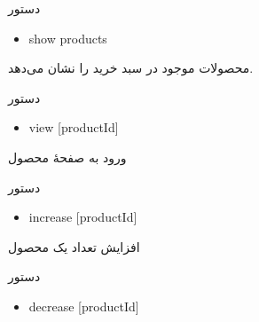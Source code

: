 \documentclass[]{article}
\begin{document}
\begin{mybox}[colback=brilliantlavender]{دستور}

\begin{latin}

\begin{itemize}[label = {$\Rightarrow$}]

\item
show products

\end{itemize}

\end{latin}

\end{mybox}

محصولات موجود در سبد خرید را نشان می‌دهد.


\begin{mybox}[colback=brilliantlavender]{دستور}

\begin{latin}

\begin{itemize}[label = {$\Rightarrow$}]

\item
view [productId]

\end{itemize}

\end{latin}

\end{mybox}

ورود به صفحهٔ محصول


\begin{mybox}[colback=brilliantlavender]{دستور}

\begin{latin}

\begin{itemize}[label = {$\Rightarrow$}]

\item
increase [productId]

\end{itemize}

\end{latin}

\end{mybox}

افزایش تعداد یک محصول



\begin{mybox}[colback=brilliantlavender]{دستور}

\begin{latin}

\begin{itemize}[label = {$\Rightarrow$}]

\item
decrease [productId]

\end{itemize}

\end{latin}

\end{mybox}
\end{document}

